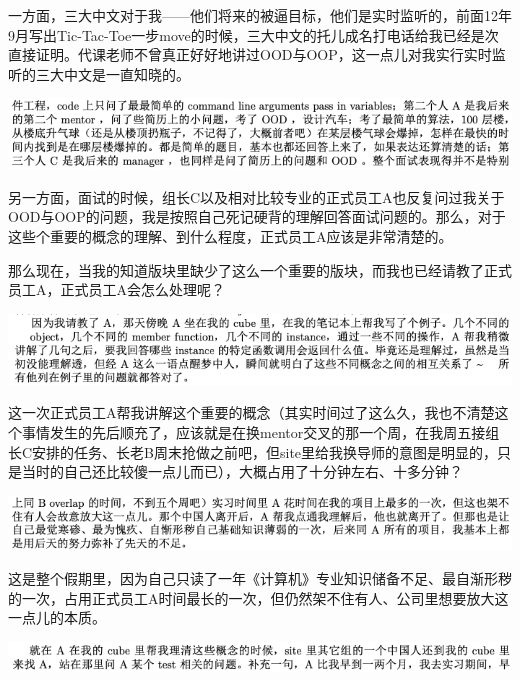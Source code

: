 \documentclass[9pt, b5paper]{article}
\begin{document}
一方面，三大中文对于我——他们将来的被逼目标，他们是实时监听的，前面12年9月写出Tic-Tac-Toe一步move的时候，三大中文的托儿成名打电话给我已经是次直接证明。代课老师不曾真正好好地讲过OOD与OOP，这一点儿对我实行实时监听的三大中文是一直知晓的。 

\begin{center}
\includegraphics[width=.9\linewidth]{./pic/backups_plans_20210508_125545.png}
\end{center}

另一方面，面试的时候，组长C以及相对比较专业的正式员工A也反复问过我关于OOD与OOP的问题，我是按照自己死记硬背的理解回答面试问题的。那么，对于这些个重要的概念的理解、到什么程度，正式员工A应该是非常清楚的。 

那么现在，当我的知道版块里缺少了这么一个重要的版块，而我也已经请教了正式员工A，正式员工A会怎么处理呢？

\begin{center}
\includegraphics[width=.9\linewidth]{./pic/backups_plans_20210508_125711.png}
\end{center}

这一次正式员工A帮我讲解这个重要的概念（其实时间过了这么久，我也不清楚这个事情发生的先后顺充了，应该就是在换mentor交叉的那一个周，在我周五接组长C安排的任务、长老B周末抢做之前吧，但site里给我换导师的意图是明显的，只是当时的自己还比较傻一点儿而已），大概占用了十分钟左右、十多分钟？

\begin{center}
\includegraphics[width=.9\linewidth]{./pic/backups_plans_20210508_134003.png}
\end{center}

这是整个假期里，因为自己只读了一年《计算机》专业知识储备不足、最自渐形秽的一次，占用正式员工A时间最长的一次，但仍然架不住有人、公司里想要放大这一点儿的本质。 

\begin{center}
\includegraphics[width=.9\linewidth]{./pic/backups_plans_20210508_130438.png}
\end{center}
\end{document}
